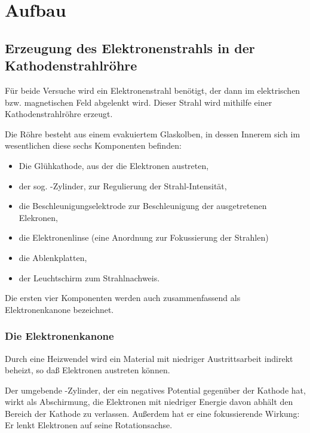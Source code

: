 
\section{Aufbau}

\subsection{Erzeugung des Elektronenstrahls in der Kathodenstrahlröhre}
\label{sec:erzeugung-elektronenstrahl}

Für beide Versuche wird ein Elektronenstrahl benötigt, der dann im
elektrischen bzw. magnetischen Feld abgelenkt wird. Dieser Strahl wird
mithilfe einer Kathodenstrahlröhre erzeugt.

Die Röhre besteht aus einem evakuiertem Glaskolben, in dessen Innerem sich im
wesentlichen diese sechs Komponenten befinden:

\begin{itemize}
\item Die Glühkathode, aus der die Elektronen austreten,
\item der sog. -Zylinder, zur Regulierung der
  Strahl-Intensität,
\item die Beschleunigungselektrode zur Beschleunigung der ausgetretenen
  Elekronen,
\item die Elektronenlinse (eine Anordnung zur Fokussierung der Strahlen)
\item die Ablenkplatten,
\item der Leuchtschirm zum Strahlnachweis.
\end{itemize}

Die ersten vier Komponenten werden auch zusammenfassend als
Elektronenkanone bezeichnet.

\subsubsection{Die Elektronenkanone}

Durch eine Heizwendel wird ein Material mit niedriger Austrittsarbeit
indirekt beheizt, so daß Elektronen austreten können. 

Der umgebende -Zylinder, der ein negatives Potential
gegenüber der Kathode hat, wirkt als Abschirmung, die Elektronen mit
niedriger Energie davon abhält den Bereich der Kathode zu
verlassen. Außerdem hat er eine fokussierende Wirkung: Er lenkt
Elektronen auf seine Rotationsachse.

